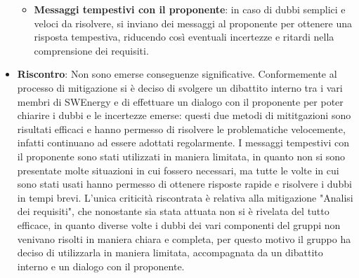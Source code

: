 \begin{itemize}
\begin{itemize}
		      \item \textbf{Messaggi tempestivi con il proponente}: in caso di dubbi
		            semplici e veloci da risolvere, si inviano dei messaggi al
		            proponente per ottenere una risposta tempestiva, riducendo così 
					eventuali incertezze e ritardi nella comprensione dei requisiti.
	      \end{itemize}

	\item \textbf{Riscontro}: Non sono emerse conseguenze significative. Conformemente al processo di mitigazione si è deciso di svolgere un dibattito interno tra i vari membri di SWEnergy
	e di effettuare un dialogo con il proponente per poter chiarire i dubbi e le incertezze emerse: questi due metodi di mititgazioni sono risultati efficaci e hanno permesso di risolvere 
	le problematiche velocemente, infatti continuano ad essere adottati regolarmente. I messaggi tempestivi con il proponente sono stati utilizzati in maniera limitata, in quanto non si sono
	presentate molte situazioni in cui fossero necessari, ma tutte le volte in cui sono stati usati hanno permesso di ottenere risposte rapide e risolvere i dubbi in tempi brevi.
	L'unica criticità riscontrata è relativa alla mitigazione "Analisi dei requisiti", che nonostante sia stata attuata non si è rivelata del tutto efficace, in quanto diverse volte
	i dubbi dei vari componenti del gruppi non venivano risolti in maniera chiara e completa, per questo motivo il gruppo ha deciso di utilizzarla in maniera limitata, accompagnata
	da un dibattito interno e un dialogo con il proponente.
	
\end{itemize}
